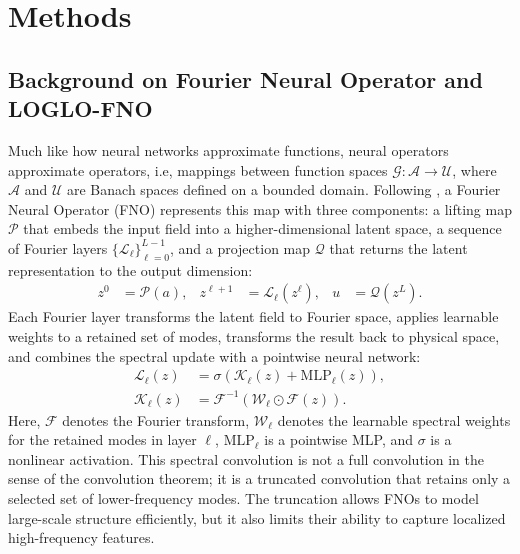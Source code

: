 \documentclass[pdflatex,sn-mathphys-ay]{sn-jnl}
\begin{document}
\section{Methods}
\label{sec:methods}

\subsection{Background on Fourier Neural Operator and LOGLO-FNO}
\label{sec:background_fno}
Much like how neural networks approximate functions, neural operators approximate operators, i.e,
mappings between function spaces 
$\mathcal{G}: \mathcal{A}\rightarrow\mathcal{U}$, where $\mathcal{A}$ and
$\mathcal{U}$ are Banach spaces defined on a bounded domain. Following
\cite{li2021fno}, a Fourier Neural Operator (FNO) represents this map with
three components: a lifting map $\mathcal{P}$ that embeds the input field into a
higher-dimensional latent space, a sequence of Fourier layers
$\{\mathcal{L}_{\ell}\}_{\ell=0}^{L-1}$, and a projection map $\mathcal{Q}$ that
returns the latent representation to the output dimension:
\begin{align}
z^{0} &= \mathcal{P}(a), &
z^{\ell+1} &= \mathcal{L}_{\ell}(z^{\ell}), &
u &= \mathcal{Q}(z^{L}).
\end{align}
Each Fourier layer transforms the latent field to Fourier space, applies
learnable weights to a retained set of modes, transforms the result back to
physical space, and combines the spectral update with a pointwise neural
network:
\begin{align}
\mathcal{L}_{\ell}(z)
&= \sigma\!\left(\mathcal{K}_{\ell}(z)+\mathrm{MLP}_{\ell}(z)\right), \\
\mathcal{K}_{\ell}(z)
&= \mathcal{F}^{-1}\!\left(
  \mathcal{W}_{\ell}\odot\mathcal{F}(z)
\right).
\end{align}
Here, $\mathcal{F}$ denotes the Fourier transform, $\mathcal{W}_{\ell}$ denotes
the learnable spectral weights for the retained modes in layer $\ell$,
$\mathrm{MLP}_{\ell}$ is a pointwise MLP, and $\sigma$ is a nonlinear activation.
This spectral convolution is not a full convolution in the sense of the
convolution theorem; it is a truncated convolution that retains only a selected
set of lower-frequency modes. The truncation allows FNOs to model large-scale
structure efficiently, but it also limits their ability to capture localized
high-frequency features.
\end{document}
